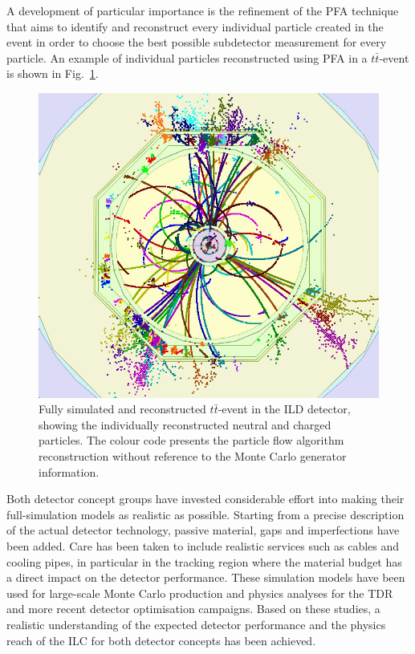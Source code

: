 \documentclass[%
 reprint,
 floatfix,
 amsmath,amssymb,
 aps,
]{revtex4-1}
\def\Fig#1{Fig.~\ref{#1}}
\begin{document}
A development of particular importance is the refinement of the 
PFA technique  that aims to identify
and reconstruct
 every individual particle created in the event
 in order to choose the best possible subdetector measurement for every particle. 
An example of individual particles reconstructed using PFA 
 in a $t\bar t$-event is shown in \Fig{fig:ttbarevent}.
\begin{figure}
\begin{center}
\includegraphics[width=0.85\hsize]{figures/ttbar_event_ILD.jpg}
\end{center}
\caption{Fully simulated and reconstructed $t\bar t$-event in the ILD
  detector, showing the individually reconstructed neutral and charged
  particles. The colour code presents the
  particle flow algorithm reconstruction without
  reference to the Monte Carlo generator
  information.}
\label{fig:ttbarevent}
\vspace{-0.7cm}
\end{figure}

Both detector concept groups have invested considerable effort into 
making their full-simulation models as realistic as possible.
Starting from a precise description of the actual 
detector technology, passive material, gaps and imperfections have been added.
Care has been taken to include realistic services such as cables and 
cooling pipes, in particular in the tracking region where
the material budget has a direct impact on the detector performance.
These simulation models have been used for large-scale Monte Carlo
production
 and physics analyses for the TDR and more recent detector optimisation
campaigns. Based on these studies, a 
realistic understanding of the expected detector performance and the physics
reach of the ILC for both detector concepts has been
achieved.
\end{document}
